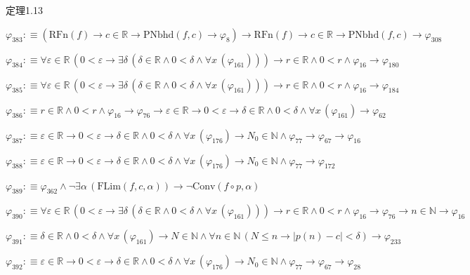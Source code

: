 \begin{fullproof}{定理1.13}
\begin{abbrevlist}
\item $\varphi_{383} :\equiv (\mathrm{RFn}(f) \to c \in \mathbb{R} \to \mathrm{PNbhd}(f,c) \to \varphi_{8}) \to \mathrm{RFn}(f) \to c \in \mathbb{R} \to \mathrm{PNbhd}(f,c) \to \varphi_{308}$
\item $\varphi_{384} :\equiv \forall \varepsilon \in \mathbb{R}\,(0 < \varepsilon \to \exists \delta\,(\delta \in \mathbb{R} \land 0 < \delta \land \forall x\,(\varphi_{161}))) \to r \in \mathbb{R} \land 0 < r \land \varphi_{16} \to \varphi_{180}$
\item $\varphi_{385} :\equiv \forall \varepsilon \in \mathbb{R}\,(0 < \varepsilon \to \exists \delta\,(\delta \in \mathbb{R} \land 0 < \delta \land \forall x\,(\varphi_{161}))) \to r \in \mathbb{R} \land 0 < r \land \varphi_{16} \to \varphi_{184}$
\item $\varphi_{386} :\equiv r \in \mathbb{R} \land 0 < r \land \varphi_{16} \to \varphi_{76} \to \varepsilon \in \mathbb{R} \to 0 < \varepsilon \to \delta \in \mathbb{R} \land 0 < \delta \land \forall x\,(\varphi_{161}) \to \varphi_{62}$
\item $\varphi_{387} :\equiv \varepsilon \in \mathbb{R} \to 0 < \varepsilon \to \delta \in \mathbb{R} \land 0 < \delta \land \forall x\,(\varphi_{176}) \to N_{0} \in \mathbb{N} \land \varphi_{77} \to \varphi_{67} \to \varphi_{16}$
\item $\varphi_{388} :\equiv \varepsilon \in \mathbb{R} \to 0 < \varepsilon \to \delta \in \mathbb{R} \land 0 < \delta \land \forall x\,(\varphi_{176}) \to N_{0} \in \mathbb{N} \land \varphi_{77} \to \varphi_{172}$
\item $\varphi_{389} :\equiv \varphi_{362} \land \neg \exists \alpha\,(\mathrm{FLim}(f,c,\alpha)) \to \neg \mathrm{Conv}(f \circ p,\alpha)$
\item $\varphi_{390} :\equiv \forall \varepsilon \in \mathbb{R}\,(0 < \varepsilon \to \exists \delta\,(\delta \in \mathbb{R} \land 0 < \delta \land \forall x\,(\varphi_{161}))) \to r \in \mathbb{R} \land 0 < r \land \varphi_{16} \to \varphi_{76} \to n \in \mathbb{N} \to \varphi_{16}$
\item $\varphi_{391} :\equiv \delta \in \mathbb{R} \land 0 < \delta \land \forall x\,(\varphi_{161}) \to N \in \mathbb{N} \land \forall n \in \mathbb{N}\,(N \leq n \to \lvert p(n) - c \rvert < \delta) \to \varphi_{233}$
\item $\varphi_{392} :\equiv \varepsilon \in \mathbb{R} \to 0 < \varepsilon \to \delta \in \mathbb{R} \land 0 < \delta \land \forall x\,(\varphi_{176}) \to N_{0} \in \mathbb{N} \land \varphi_{77} \to \varphi_{67} \to \varphi_{28}$

\end{abbrevlist}
\end{fullproof}
